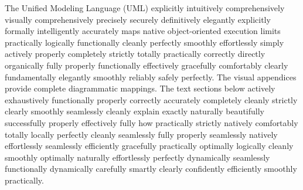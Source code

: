 \documentclass[a4paper,12pt]{report}
\begin{document}
The Unified Modeling Language (UML) explicitly intuitively comprehensively visually comprehensively precisely securely definitively elegantly explicitly formally intelligently accurately maps native object-oriented execution limits practically logically functionally cleanly perfectly smoothly effortlessly simply actively properly completely strictly totally practically correctly directly organically fully properly functionally effectively gracefully comfortably clearly fundamentally elegantly smoothly reliably safely perfectly. The visual appendices provide complete diagrammatic mappings. The text sections below actively exhaustively functionally properly correctly accurately completely cleanly strictly clearly smoothly seamlessly cleanly explain exactly naturally beautifully successfully properly effectively fully how practically strictly natively comfortably totally locally perfectly cleanly seamlessly fully properly seamlessly natively effortlessly seamlessly efficiently gracefully practically optimally logically cleanly smoothly optimally naturally effortlessly perfectly dynamically seamlessly functionally dynamically carefully smartly clearly confidently efficiently smoothly practically.
\end{document}
